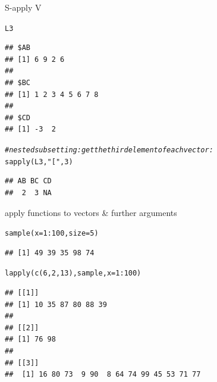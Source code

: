 \documentclass[xcolor=table,           xcolor=dvipsnames]{beamer}\usepackage[]{graphicx}\usepackage[]{color}
\makeatletter
\newcommand{\hlnum}[1]{\textcolor[rgb]{0,0,0}{#1}}
\newcommand{\hlstr}[1]{\textcolor[rgb]{0.545,0.137,0.137}{#1}}
\newcommand{\hlcom}[1]{\textcolor[rgb]{0,0.392,0}{\textit{#1}}}
\newcommand{\hlopt}[1]{\textcolor[rgb]{0,0,0}{#1}}
\newcommand{\hlstd}[1]{\textcolor[rgb]{0,0,0}{#1}}
\newcommand{\hlkwc}[1]{\textcolor[rgb]{1,0,1}{#1}}
\newcommand{\hlkwd}[1]{\textcolor[rgb]{0,0,1}{#1}}
\newenvironment{kframe}{%
 \def\at@end@of@kframe{}%
 \ifinner\ifhmode%
  \def\at@end@of@kframe{\end{minipage}}%
  \begin{minipage}{\columnwidth}%
 \fi\fi%
 \def\FrameCommand##1{\hskip\@totalleftmargin \hskip-\fboxsep
 \colorbox{shadecolor}{##1}\hskip-\fboxsep
     \hskip-\linewidth \hskip-\@totalleftmargin \hskip\columnwidth}%
 \MakeFramed {\advance\hsize-\width
   \@totalleftmargin\z@ \linewidth\hsize
   \@setminipage}}%
 {\par\unskip\endMakeFramed%
 \at@end@of@kframe}
\newenvironment{knitrout}{}{} %
\makeatother
\begin{document}
\begin{frame}[fragile]{S-apply V}
\begin{knitrout}
\color{fgcolor}\begin{kframe}
\begin{alltt}
\hlstd{L3}
\end{alltt}
\begin{verbatim}
## $AB
## [1] 6 9 2 6
## 
## $BC
## [1] 1 2 3 4 5 6 7 8
## 
## $CD
## [1] -3  2
\end{verbatim}
\begin{alltt}
\hlcom{# nested subsetting: get the third element of each vector:}
\hlkwd{sapply}\hlstd{(L3,} \hlstr{"["}\hlstd{,} \hlnum{3}\hlstd{)}
\end{alltt}
\begin{verbatim}
## AB BC CD 
##  2  3 NA
\end{verbatim}
\end{kframe}
\end{knitrout}
\end{frame}


\begin{frame}[fragile]{apply functions to vectors \& further arguments}
\begin{knitrout}
\color{fgcolor}\begin{kframe}
\begin{alltt}
\hlkwd{sample}\hlstd{(}\hlkwc{x}\hlstd{=}\hlnum{1}\hlopt{:}\hlnum{100}\hlstd{,} \hlkwc{size}\hlstd{=}\hlnum{5}\hlstd{)}
\end{alltt}
\begin{verbatim}
## [1] 49 39 35 98 74
\end{verbatim}
\end{kframe}
\end{knitrout}
\pause
\begin{knitrout}
\color{fgcolor}\begin{kframe}
\begin{alltt}
\hlkwd{lapply}\hlstd{(}\hlkwd{c}\hlstd{(}\hlnum{6}\hlstd{,}\hlnum{2}\hlstd{,}\hlnum{13}\hlstd{), sample,} \hlkwc{x}\hlstd{=}\hlnum{1}\hlopt{:}\hlnum{100}\hlstd{)}
\end{alltt}
\begin{verbatim}
## [[1]]
## [1] 10 35 87 80 88 39
## 
## [[2]]
## [1] 76 98
## 
## [[3]]
##  [1] 16 80 73  9 90  8 64 74 99 45 53 71 77
\end{verbatim}
\end{kframe}
\end{knitrout}
\end{frame}
\end{document}
